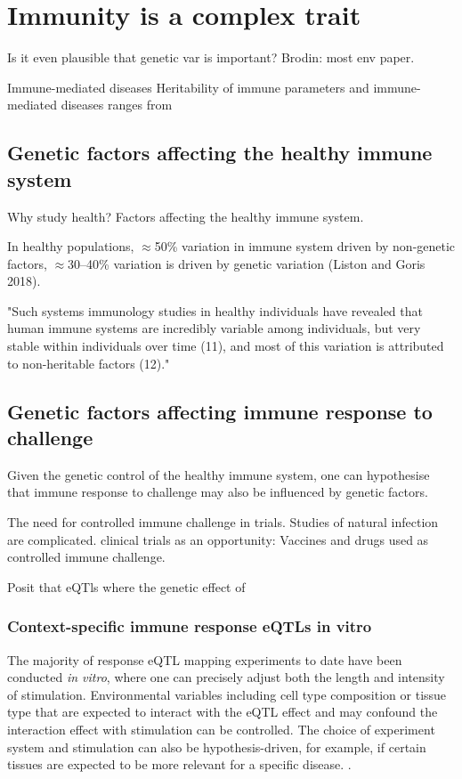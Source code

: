 \section{Immunity is a complex trait}

Is it even plausible that genetic var is important?
Brodin: most env paper.

Immune-mediated diseases
Heritability of immune parameters and immune-mediated diseases
    ranges from 

\subsection{Genetic factors affecting the healthy immune system}

Why study health?
Factors affecting the healthy immune system.

In healthy populations, $\approx$50\% variation in immune system driven by non-genetic factors, $\approx$30–40\% variation is driven by genetic variation (Liston and Goris 2018).

"Such systems  immunology studies in  healthy individuals have  revealed that human immune  systems are incredibly  variable among individuals,  but very stable within  individuals over time (11),  and most of this variation is  attributed to non-heritable  factors (12)."

\subsection{Genetic factors affecting immune response to challenge}

Given the genetic control of the healthy immune system, one can hypothesise that immune response to challenge may also be influenced by genetic factors.

The need for controlled immune challenge in trials.
Studies of natural infection are complicated.
clinical trials as an opportunity: 
    Vaccines and drugs used as controlled immune challenge.

Posit that eQTls where the genetic effect of 

\subsubsection{Context-specific immune response eQTLs in vitro}

The majority of response eQTL mapping experiments to date have been conducted \textit{in vitro}, where one can precisely adjust both the length and intensity of stimulation.
Environmental variables including cell type composition or tissue type that are expected to interact with the eQTL effect and may confound the interaction effect with stimulation can be controlled.
The choice of experiment system and stimulation can also be hypothesis-driven, for example, if certain tissues are expected to be more relevant for a specific disease. 
.

